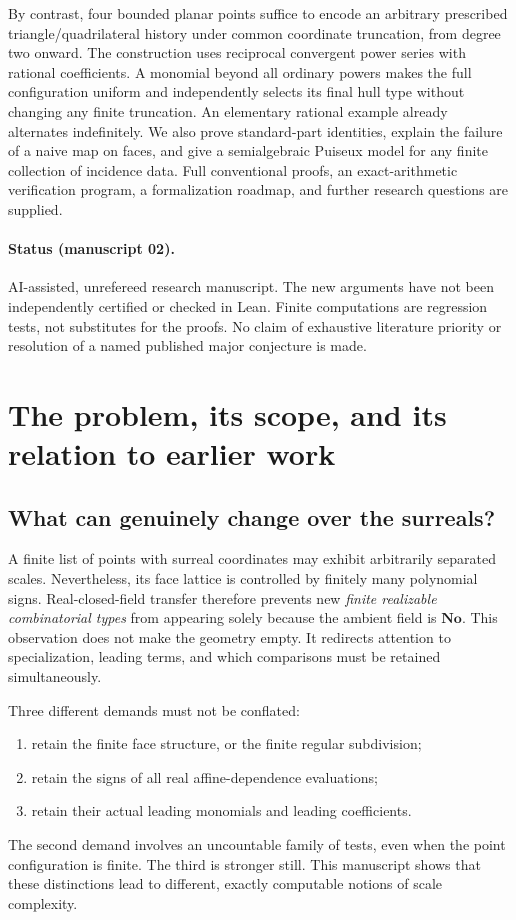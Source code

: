 \documentclass[11pt,a4paper]{article}
\numberwithin{equation}{section}
\theoremstyle{plain}
\newcommand{\No}{\mathbf{No}}
\begin{document}
By contrast, four bounded planar points suffice to encode an arbitrary
prescribed triangle/quadrilateral history under common coordinate truncation,
from degree two onward. The construction uses reciprocal convergent power
series with rational coefficients. A monomial beyond all ordinary powers
makes the full configuration uniform and independently selects its final
hull type without changing any finite truncation. An elementary rational
example already alternates indefinitely. We also prove standard-part
identities, explain the failure of a naive map on faces, and give a
semialgebraic Puiseux model for any finite collection of incidence data.
Full conventional proofs, an exact-arithmetic verification program, a
formalization roadmap, and further research questions are supplied.

\paragraph{Status (manuscript 02).}
AI-assisted, unrefereed research manuscript.
The new arguments have not been independently certified or checked in Lean.
Finite computations are regression tests, not substitutes for the proofs.
No claim of exhaustive literature priority or resolution of a named published
major conjecture is made.
\section{The problem, its scope, and its relation to earlier work}
\label{poly:sec:scope}

\subsection{What can genuinely change over the surreals?}

A finite list of points with surreal coordinates may exhibit arbitrarily
separated scales. Nevertheless, its face lattice is controlled by finitely
many polynomial signs. Real-closed-field transfer therefore prevents new
\emph{finite realizable combinatorial types} from appearing solely because
the ambient field is $\No$. This observation does not make the geometry
empty. It redirects attention to specialization, leading terms, and which
comparisons must be retained simultaneously.

Three different demands must not be conflated:
\begin{enumerate}[label=(\roman*)]
\item retain the finite face structure, or the finite regular subdivision;
\item retain the signs of all real affine-dependence evaluations;
\item retain their actual leading monomials and leading coefficients.
\end{enumerate}
The second demand involves an uncountable family of tests, even when the
point configuration is finite. The third is stronger still. This manuscript
shows that these distinctions lead to different, exactly computable notions
of scale complexity.
\end{document}
